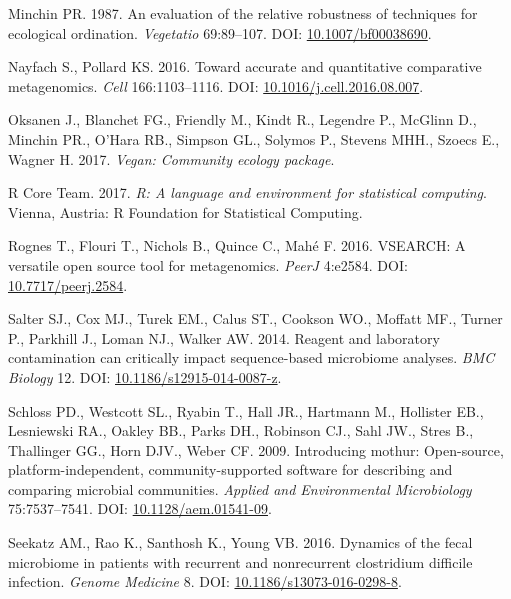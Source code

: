 \documentclass[12pt,]{article}
\begin{document}
\hypertarget{ref-bc_index_Minchin1987}{}
Minchin PR. 1987. An evaluation of the relative robustness of techniques
for ecological ordination. \emph{Vegetatio} 69:89--107. DOI:
\href{https://doi.org/10.1007/bf00038690}{10.1007/bf00038690}.

\hypertarget{ref-metagenomcis_bias_Nayfach_2016}{}
Nayfach S., Pollard KS. 2016. Toward accurate and quantitative
comparative metagenomics. \emph{Cell} 166:1103--1116. DOI:
\href{https://doi.org/10.1016/j.cell.2016.08.007}{10.1016/j.cell.2016.08.007}.

\hypertarget{ref-vegan_citation}{}
Oksanen J., Blanchet FG., Friendly M., Kindt R., Legendre P., McGlinn
D., Minchin PR., O'Hara RB., Simpson GL., Solymos P., Stevens MHH.,
Szoecs E., Wagner H. 2017. \emph{Vegan: Community ecology package}.

\hypertarget{ref-r_citation_2017}{}
R Core Team. 2017. \emph{R: A language and environment for statistical
computing}. Vienna, Austria: R Foundation for Statistical Computing.

\hypertarget{ref-vsearch_Rognes_2016}{}
Rognes T., Flouri T., Nichols B., Quince C., Mahé F. 2016. VSEARCH: A
versatile open source tool for metagenomics. \emph{PeerJ} 4:e2584. DOI:
\href{https://doi.org/10.7717/peerj.2584}{10.7717/peerj.2584}.

\hypertarget{ref-contamination_Salter2014}{}
Salter SJ., Cox MJ., Turek EM., Calus ST., Cookson WO., Moffatt MF.,
Turner P., Parkhill J., Loman NJ., Walker AW. 2014. Reagent and
laboratory contamination can critically impact sequence-based microbiome
analyses. \emph{BMC Biology} 12. DOI:
\href{https://doi.org/10.1186/s12915-014-0087-z}{10.1186/s12915-014-0087-z}.

\hypertarget{ref-mothur_schloss_2009}{}
Schloss PD., Westcott SL., Ryabin T., Hall JR., Hartmann M., Hollister
EB., Lesniewski RA., Oakley BB., Parks DH., Robinson CJ., Sahl JW.,
Stres B., Thallinger GG., Horn DJV., Weber CF. 2009. Introducing mothur:
Open-source, platform-independent, community-supported software for
describing and comparing microbial communities. \emph{Applied and
Environmental Microbiology} 75:7537--7541. DOI:
\href{https://doi.org/10.1128/aem.01541-09}{10.1128/aem.01541-09}.

\hypertarget{ref-erin_seekatz_2016}{}
Seekatz AM., Rao K., Santhosh K., Young VB. 2016. Dynamics of the fecal
microbiome in patients with recurrent and nonrecurrent clostridium
difficile infection. \emph{Genome Medicine} 8. DOI:
\href{https://doi.org/10.1186/s13073-016-0298-8}{10.1186/s13073-016-0298-8}.
\end{document}
